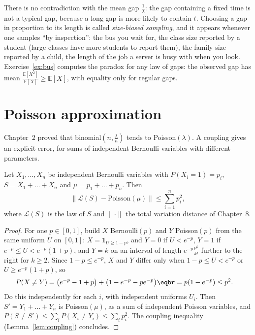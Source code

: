 There is no contradiction with the mean gap $\frac1\lambda$: the gap containing a fixed time is not a typical gap, because a long gap is
more likely to contain $t$. Choosing a gap in proportion to its length is called \emph{size-biased sampling}, and it appears whenever one
samples ``by inspection'': the bus you wait for, the class size reported by a student (large classes have more
students to report them), the family size reported by a child, the length of the job a server is busy with when you
look. Exercise~\ref{ex:bus} computes the paradox for any law of gaps: the observed gap has mean $\frac{\mathbb E[X^2]}{\mathbb E[X]}\ge\mathbb E[X]$, with equality only for
regular gaps.

\section{Poisson approximation}

Chapter~2 proved that binomial$(n,\frac\lambda n)$ tends to Poisson$(\lambda)$. A coupling gives an explicit error, for sums of independent Bernoulli
variables with different parameters.

\begin{theorem}\label{thm:lecam}
Let $X_1,\dots,X_n$ be independent Bernoulli variables with $P(X_i=1)=p_i$, $S=X_1+\dots+X_n$ and $\mu=p_1+\dots+p_n$. Then
\[
\bigl\|\mathcal L(S)-\text{Poisson}(\mu)\bigr\|\le\sum_{i=1}^np_i^2,
\]
where $\mathcal L(S)$ is the law of $S$ and $\|\cdot\|$ the total variation distance of Chapter~8.
\end{theorem}
\begin{proof}
For one $p\in[0,1]$, build $X$ Bernoulli$(p)$ and $Y$ Poisson$(p)$ from the same uniform $U$ on $[0,1]$: $X=\mathbf 1_{U\ge1-p}$, and $Y=0$ if $U<e^{-p}$, $Y=1$ if
$e^{-p}\le U<e^{-p}(1+p)$, and $Y=k$ on an interval of length $e^{-p}\frac{p^k}{k!}$ further to the right for $k\ge2$. Since $1-p\le e^{-p}$, $X$ and $Y$ differ only when
$1-p\le U<e^{-p}$ or $U\ge e^{-p}(1+p)$, so
\[
\begin{aligned}P(X\ne Y)&=\bigl(e^{-p}-1+p\bigr)+\bigl(1-e^{-p}-pe^{-p}\bigr)\eqbr=p(1-e^{-p})\le p^2.\end{aligned}
\]
Do this independently for each $i$, with independent uniforms $U_i$. Then $S'=Y_1+\dots+Y_n$ is Poisson$(\mu)$, as a sum of independent Poisson variables,
and $P(S\ne S')\le\sum_iP(X_i\ne Y_i)\le\sum_ip_i^2$. The coupling inequality (Lemma~\ref{lem:coupling}) concludes.
\end{proof}

